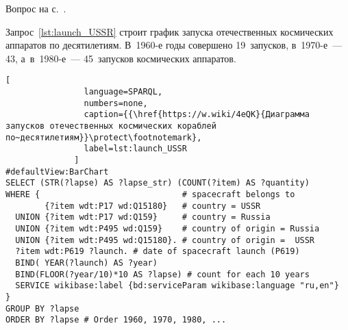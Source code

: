 \begin{task}
    \label{answer:launches_USSR}
    \AnswerBackref Вопрос на с.~\pageref{question:spacecraft_1}.

Запрос~\ref{lst:launch_USSR} строит график запуска отечественных космических аппаратов по десятилетиям.
    \mbox{В~1960-е} годы совершено 19~запусков, в~1970-е~--- 43, 
    а~в~1980-е~--- 45~запусков космических аппаратов.

\begin{lstlisting}[ 
                language=SPARQL, 
                numbers=none, 
                caption={{\href{https://w.wiki/4eQK}{Диаграмма запусков отечественных космических кораблей по~десятилетиям}}\protect\footnotemark}, 
                label=lst:launch_USSR
              ]
#defaultView:BarChart
SELECT (STR(?lapse) AS ?lapse_str) (COUNT(?item) AS ?quantity)
WHERE {                             # spacecraft belongs to
        {?item wdt:P17 wd:Q15180}   # country = USSR
  UNION {?item wdt:P17 wd:Q159}     # country = Russia
  UNION {?item wdt:P495 wd:Q159}    # country of origin = Russia
  UNION {?item wdt:P495 wd:Q15180}. # country of origin =  USSR
  ?item wdt:P619 ?launch. # date of spacecraft launch (P619)
  BIND( YEAR(?launch) AS ?year) 
  BIND(FLOOR(?year/10)*10 AS ?lapse) # count for each 10 years
  SERVICE wikibase:label {bd:serviceParam wikibase:language "ru,en"}
} 
GROUP BY ?lapse
ORDER BY ?lapse # Order 1960, 1970, 1980, ...
\end{lstlisting}
\end{task}



